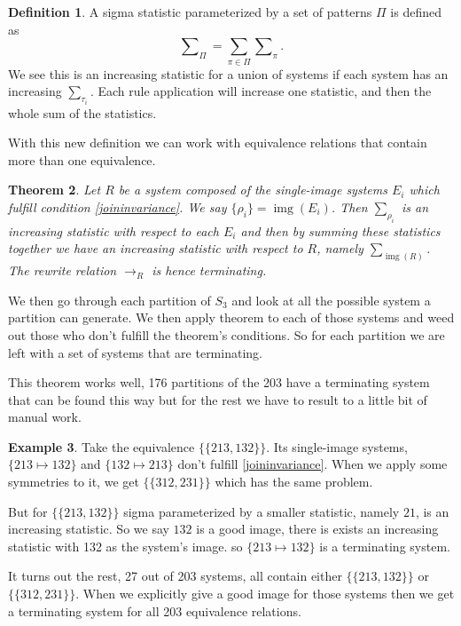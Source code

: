 \documentclass[openany, a4paper, 11pt, english]{article}
\newcommand{\patternrule}{ \mapsto \!}
\newtheorem{theorem}{Theorem}[section]
\theoremstyle{definition}
\newtheorem{definition}[theorem]{Definition}
\newtheorem{example}[theorem]{Example}
\newcommand{\Sym}{S}
\DeclareMathOperator{\img}{img}
\begin{document}
\begin{definition}
    A sigma statistic parameterized by a set of patterns $\Pi$ is defined as
    $$
        \sum\nolimits_\Pi = \sum_{\pi \in \Pi} \sum\nolimits_{\pi}.
    $$
    We see this is an increasing statistic for a union of systems if
    each system has an increasing $\sum_{\tau_i}$.  Each rule application will
    increase one statistic, and then the whole sum of the statistics.
\end{definition}

With this new definition we can work with equivalence relations that contain more than one
equivalence.

\begin{theorem}
    Let $R$ be a system composed of the single-image systems $E_i$ which fulfill
    condition \eqref{joininvariance}. We say $\{\rho_i\} = \img(E_i)$. Then
    $\sum\nolimits_{\rho_i}$ is an increasing statistic with respect to each
    $E_i$ and then by summing these statistics together we have an increasing
    statistic with respect to $R$, namely $\sum_{\img(R)}$.  The rewrite
    relation $\to_R$ is hence terminating.
\end{theorem}

We then go through each partition of $\Sym_3$ and look at all the possible
system a partition can generate. We then apply theorem to each of those systems
and weed out those who don't fulfill the theorem's conditions. So for each
partition we are left with a set of systems that are terminating.

This theorem works well, 176 partitions of the 203 have a terminating system
that can be found this way but for the rest we have to result to a little bit of
manual work.

\begin{example}
    Take the equivalence $\{ \{ 213, 132 \} \}$. Its single-image systems,
    ${\{ 213 \patternrule 132 \}}$ and ${\{ 132 \patternrule 213 \}}$
    don't fulfill \eqref{joininvariance}.
    When we apply some symmetries to it, we get $\{ \{ 312, 231 \} \}$ which has the same problem.

    But for $\{ \{ 213, 132 \} \}$ sigma parameterized by a smaller statistic, namely $21$, is an
    increasing statistic. So we say $132$ is a good image, there is exists an
    increasing statistic with 132 as the system's image.
    so $\{ 213 \patternrule 132 \}$ is a terminating system.
\end{example}

It turns out the rest, 27 out of 203 systems, all contain either $\{ \{ 213, 132
\} \}$ or $\{ \{ 312, 231 \} \}$. When we explicitly give a good image for those
systems then we get a terminating system for all 203 equivalence relations.
\end{document}
